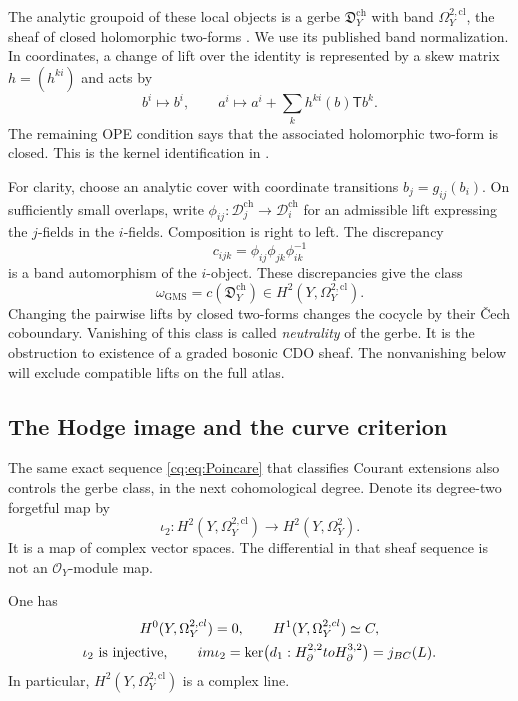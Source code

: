 The analytic groupoid of these local objects is a gerbe
$\mathfrak D_Y^{\mathrm{ch}}$ with band
$\Omega_Y^{2,\mathrm{cl}}$, the sheaf of closed holomorphic
two-forms \cite[Theorem~3 and Section~6]{GMSGerbes}.
We use its published band normalization.
In coordinates, a change of lift over the identity is represented
by a skew matrix $h=(h^{ki})$ and acts by
\begin{equation}\label{ch:eq:skew-twist}
       b^i\longmapsto b^i,\qquad
       a^i\longmapsto a^i+\sum_k h^{ki}(b)\mathsf T b^k.
\end{equation}
The remaining OPE condition says that the associated holomorphic
two-form is closed. This is the kernel identification in
\cite[Section~6]{GMSGerbes}.

For clarity, choose an analytic cover with coordinate transitions
$b_j=g_{ij}(b_i)$.
On sufficiently small overlaps, write
$\phi_{ij}:\mathcal D_j^{\mathrm{ch}}\to\mathcal D_i^{\mathrm{ch}}$
for an admissible lift expressing the $j$-fields in the $i$-fields.
Composition is right to left. The discrepancy
\[
                   c_{ijk}=\phi_{ij}\phi_{jk}\phi_{ik}^{-1}
\]
is a band automorphism of the $i$-object.
These discrepancies give the class
\begin{equation}\label{ch:eq:gerbe-class}
       \omega_{\mathrm{GMS}}
       =c(\mathfrak D_Y^{\mathrm{ch}})
          \in H^2(Y,\Omega_Y^{2,\mathrm{cl}}).
\end{equation}
Changing the pairwise lifts by closed two-forms changes the
cocycle by their \v{C}ech coboundary.
Vanishing of this class is called \emph{neutrality} of the gerbe.
It is the obstruction to existence of a graded bosonic CDO sheaf.
The nonvanishing below will exclude compatible lifts on the full atlas.

\subsection{The Hodge image and the curve criterion}

The same exact sequence \eqref{cq:eq:Poincare} that classifies
Courant extensions also controls the gerbe class, in the next
cohomological degree. Denote its degree-two forgetful map by
\[
 \iota_2:H^2(Y,\Omega_Y^{2,\mathrm{cl}})
                     \longrightarrow H^2(Y,\Omega_Y^2).
\]
It is a map of complex vector spaces. The differential in that
sheaf sequence is not an $\mathcal O_Y$-module map.

\begin{proposition}\label{ch:prop:band-cohomology}
One has
\begin{equation}\label{ch:eq:band-cohomology}
 \begin{gathered}
 H^0(Y,\Omega_Y^{2,cl})=0,\qquad
 H^1(Y,\Omega_Y^{2,cl})\simeq C,\\
 \iota_2\text{ is injective},\qquad
 im\iota_2
    =\ker\bigl(d_1:H_{\partial}^{2,2}
                           to H_{\partial}^{3,2}\bigr)
    =j_{BC}(L).
 \end{gathered}
\end{equation}
In particular, $H^2(Y,\Omega_Y^{2,\mathrm{cl}})$ is a
complex line.
\end{proposition}

